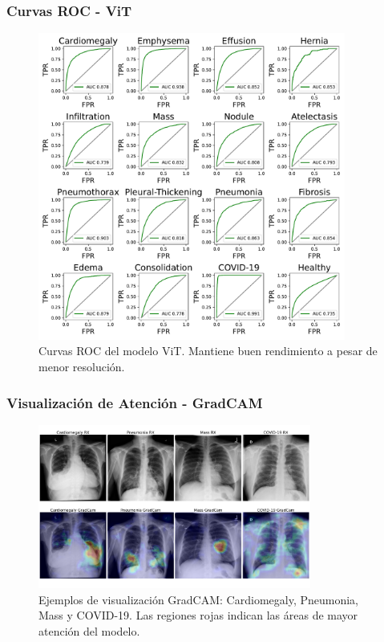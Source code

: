 \begin{frame}
\frametitle{Curvas ROC - ViT}
\begin{figure}[ht!]
    \centering
    \includegraphics[width=0.9\textwidth]{../Chapters/4. ViT-Lung/images/ROC_AUC_ViT.pdf}
    \caption{Curvas ROC del modelo ViT. Mantiene buen rendimiento a pesar de menor resolución.}
\end{figure}
\end{frame}

\begin{frame}
\frametitle{Visualización de Atención - GradCAM}
\begin{figure}[ht!]
    \centering
    \includegraphics[width=0.8\textwidth]{../Chapters/4. ViT-Lung/images/vlgrid.png}
    \caption{Ejemplos de visualización GradCAM: Cardiomegaly, Pneumonia, Mass y COVID-19. Las regiones rojas indican las áreas de mayor atención del modelo.}
\end{figure}
\end{frame}

